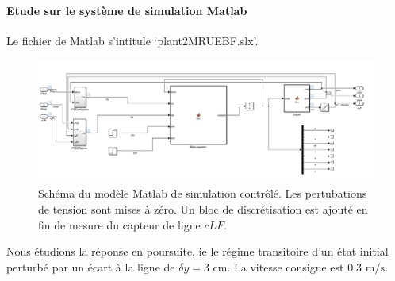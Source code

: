 \documentclass{report}
\begin{document}
\newpage

\paragraph{Etude sur le système de simulation Matlab}

Le fichier de Matlab s'intitule `plant2MRUEBF.slx'.

\begin{figure}[h]
    \centering
    \includegraphics[width=\textwidth]{figures/sysSimulBF.png}
    \caption{
    Schéma du modèle Matlab de simulation contrôlé. 
    Les pertubations de tension sont mises à zéro.
    Un bloc de discrétisation est ajouté en fin de mesure du capteur
    de ligne $cLF$.}
\end{figure}

Nous étudions la réponse en poursuite, ie le régime transitoire d'un
état initial perturbé par un écart à la ligne de $\delta y = 3 \text{ cm}$.
La vitesse consigne est $0.3 \text{ m/s}$.
\end{document}
